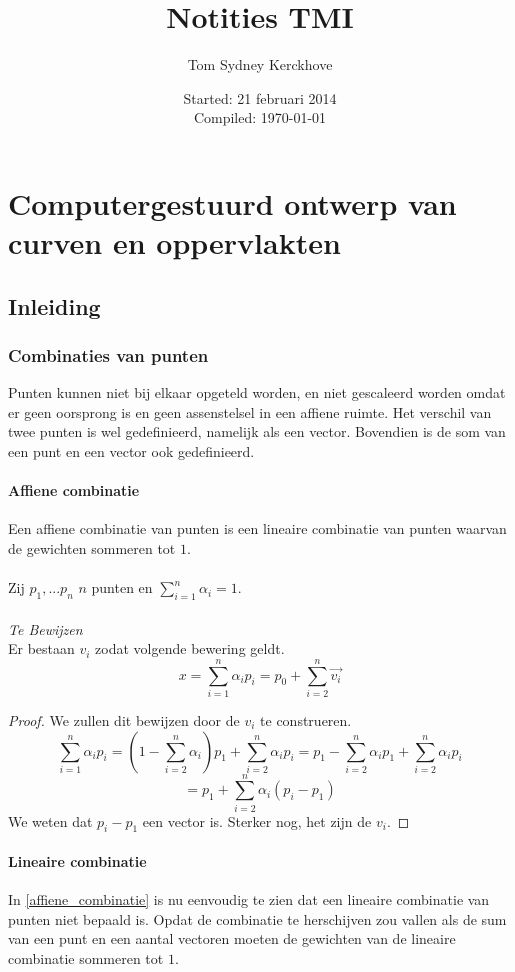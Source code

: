 \documentclass[10pt,a4paper,oneside]{book}
\author{Tom Sydney Kerckhove}
\title{Notities TMI}
\date{Started: 21 februari 2014\\ Compiled: \today}
\begin{document}

\tableofcontents


\part{Computergestuurd ontwerp van curven en oppervlakten}
\chapter{Inleiding}
\section{Combinaties van punten}
Punten kunnen niet bij elkaar opgeteld worden, en niet gescaleerd worden omdat er geen oorsprong is en geen assenstelsel in een affiene ruimte.
Het verschil van twee punten is wel gedefinieerd, namelijk als een vector. Bovendien is de som van een punt en een vector ook gedefinieerd.
\subsection{Affiene combinatie}
Een affiene combinatie van punten is een lineaire combinatie van punten waarvan de gewichten sommeren tot $1$.\\\\
Zij $p_1,...p_n$ $n$ punten en $\sum_{i=1}^n\alpha_i=1$.\\\\
\textit{Te Bewijzen}\\
\label{affiene_combinatie}
Er bestaan $v_i$ zodat volgende bewering geldt.
\[
x = \sum_{i=1}^n\alpha_ip_i = p_0 + \sum_{i=2}^n\vec{v_i}
\]

\begin{proof}
We zullen dit bewijzen door de $v_i$ te construeren.
\[
\sum_{i=1}^n\alpha_ip_i
= \left(1-\sum_{i=2}^n\alpha_i\right)p_1 + \sum_{i=2}^n\alpha_ip_i
= p_1 - \sum_{i=2}^n\alpha_ip_1 + \sum_{i=2}^n\alpha_ip_i
\]
\[
=
p_1 + \sum_{i=2}^n\alpha_i(p_i-p_1)
\]
We weten dat $p_i-p_1$ een vector is. Sterker nog, het zijn de $v_i$.
\end{proof}
 
\subsection{Lineaire combinatie}
In \ref{affiene_combinatie} is nu eenvoudig te zien dat een lineaire combinatie van punten niet bepaald is.
Opdat de combinatie te herschijven zou vallen als de sum van een punt en een aantal vectoren moeten de gewichten van de lineaire combinatie sommeren tot $1$. 
\end{document}
